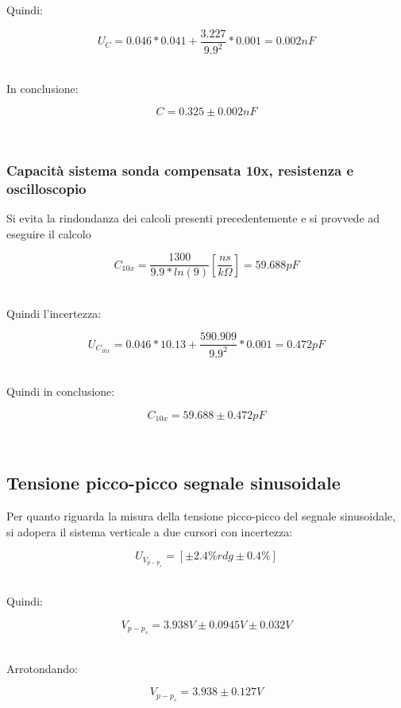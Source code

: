 \documentclass[a4paper]{article}
\begin{document}
Quindi:
\begin{Large}
	\begin{equation}
		{U_C}= 0.046*0.041+\frac{3.227}{9.9^2}*0.001=0.002 nF
	\end{equation}
\end{Large}\\

In conclusione: 
\begin{Large}
	\begin{equation}
		C=0.325\pm 0.002nF
	\end{equation}
\end{Large}\\

\subsubsection{Capacità sistema sonda compensata 10x, resistenza e oscilloscopio }
Si evita la rindondanza dei calcoli presenti precedentemente e si provvede ad eseguire il calcolo
\begin{Large}
	\begin{equation}
  		C_{10x}= \frac{1300}{9.9*ln(9)} [\frac{ns}{k\Omega}]= 59.688pF
	\end{equation}
\end{Large}\\

Quindi l'incertezza:
\begin{Large}
	\begin{equation}
		{U_{C_{10x}}}= 0.046*10.13+\frac{590.909}{9.9^2}*0.001=0.472 pF
	\end{equation}
\end{Large}\\

Quindi in conclusione:
\begin{Large}
	\begin{equation}
		{C_{10x}}= 59.688 \pm0.472 pF
	\end{equation}
\end{Large}\\

\subsection{Tensione picco-picco segnale sinusoidale} %
Per quanto riguarda la misura della tensione picco-picco del segnale sinusoidale, si adopera il sistema verticale a due cursori con incertezza:
\begin{Large}
	\begin{equation}
		U_{V_{p-p_{s}}}= [\pm 2.4\% rdg\pm 0.4\%]
	\end{equation}
\end{Large}\\

Quindi: 
\begin{Large}
	\begin{equation}
		V_{p-p_{s}}= 3.938V\pm 0.0945V\pm 0.032V
	\end{equation}
\end{Large}\\

Arrotondando:
\begin{Large}
	\begin{equation}
		V_{p-p_{s}}= 3.938\pm 0.127V
\end{equation}
\end{Large}\\
\end{document}
